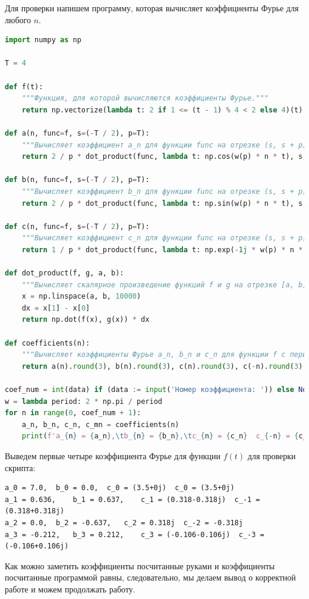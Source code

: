 \documentclass[a4paper]{article}
\begin{document}
Для проверки напишем программу, которая вычисляет коэффициенты Фурье для любого $n$.
\begin{lstlisting}[language=Python, caption=Вычисление коэффициентов Фурье]
import numpy as np

T = 4

def f(t):
    """Функция, для которой вычисляются коэффициенты Фурье."""
    return np.vectorize(lambda t: 2 if 1 <= (t - 1) % 4 < 2 else 4)(t)

def a(n, func=f, s=(-T / 2), p=T):
    """Вычисляет коэффициент a_n для функции func на отрезке (s, s + p)."""
    return 2 / p * dot_product(func, lambda t: np.cos(w(p) * n * t), s, s + p)

def b(n, func=f, s=(-T / 2), p=T):
    """Вычисляет коэффициент b_n для функции func на отрезке (s, s + p)."""
    return 2 / p * dot_product(func, lambda t: np.sin(w(p) * n * t), s, s + p)

def c(n, func=f, s=(-T / 2), p=T):
    """Вычисляет коэффициент c_n для функции func на отрезке (s, s + p)."""
    return 1 / p * dot_product(func, lambda t: np.exp(-1j * w(p) * n * t), s, s + p)

def dot_product(f, g, a, b):
    """Вычисляет скалярное произведение функций f и g на отрезке [a, b]."""
    x = np.linspace(a, b, 10000)
    dx = x[1] - x[0]
    return np.dot(f(x), g(x)) * dx

def coefficients(n):
    """Вычисляет коэффициенты Фурье a_n, b_n и c_n для функции f с периодом T."""
    return a(n).round(3), b(n).round(3), c(n).round(3), c(-n).round(3)

coef_num = int(data) if (data := input('Номер коэффициента: ')) else None
w = lambda period: 2 * np.pi / period
for n in range(0, coef_num + 1):
    a_n, b_n, c_n, c_mn = coefficients(n)
    print(f'a_{n} = {a_n},\tb_{n} = {b_n},\tc_{n} = {c_n}  c_{-n} = {c_mn}')    
\end{lstlisting}

Выведем первые четыре коэффициента Фурье для функции $f(t)$ для проверки скрипта:
\begin{lstlisting}[caption=Вывод программы]
a_0 = 7.0,	b_0 = 0.0,	c_0 = (3.5+0j)  c_0 = (3.5+0j)
a_1 = 0.636,	b_1 = 0.637,	c_1 = (0.318-0.318j)  c_-1 = (0.318+0.318j)
a_2 = 0.0,	b_2 = -0.637,	c_2 = 0.318j  c_-2 = -0.318j
a_3 = -0.212,	b_3 = 0.212,	c_3 = (-0.106-0.106j)  c_-3 = (-0.106+0.106j)
\end{lstlisting}
Как можно заметить коэффициенты посчитанные руками и коэффициенты посчитанные программой равны, следовательно, мы делаем вывод о корректной работе и можем продолжать работу.
\end{document}

